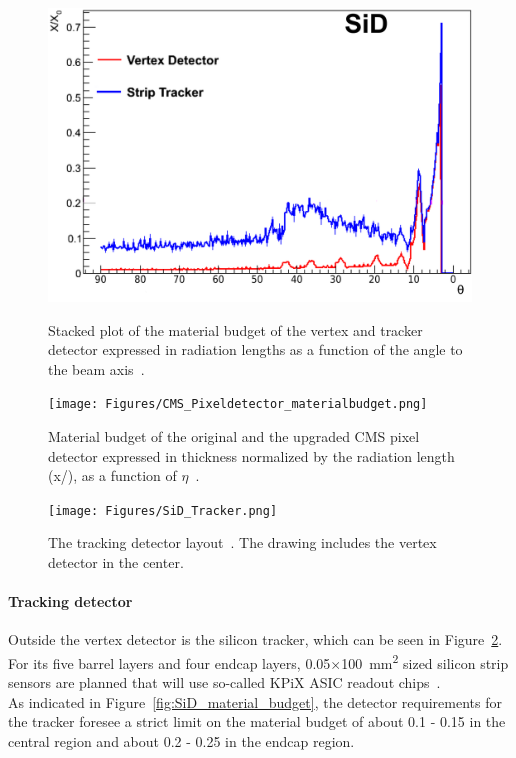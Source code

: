 \begin{figure}[!h]
\centering
 \begin{minipage}[t]{0.49\textwidth}
 \centering
\includegraphics[width=\textwidth]{Figures/SiD_material_budget.png}
\caption[Material budget of the \sid vertex and tracker detector]{Stacked plot of the material budget of the \sid vertex and tracker detector expressed in radiation lengths as a function of the angle to the beam axis~\cite[cf. p. 51]{Marcels_general_SiD_slides}.}
\label{fig:SiD_material_budget}
\end{minipage}
\hfill
\begin{minipage}[t]{0.49\textwidth}
\centering
\texttt{[image: Figures/CMS\_Pixeldetector\_materialbudget.png]}
\caption[Material budget of the CMS pixel detector]{Material budget of the original and the upgraded CMS pixel detector expressed in thickness normalized by the radiation length (x/\si{\xzero}), as a function of $\eta$~\cite{CMS_pixeldetector}.}
\label{fig:CMS}
\end{minipage}
\end{figure}


\begin{figure}[h!]
\centering
\texttt{[image: Figures/SiD\_Tracker.png]}
\caption[Drawing of the \sid tracking detector]{The \sid tracking detector layout~\cite{SiD_Update2}.
The drawing includes the vertex detector in the center.}
\label{fig:SiD_tracker}
\end{figure}

\paragraph{Tracking detector}
Outside the vertex detector is the silicon tracker, which can be seen in Figure~\ref{fig:SiD_tracker}.
For its five barrel layers and four endcap layers, \num{0.05}$\times$\SI{100}{\milli\meter\squared} sized silicon strip sensors are planned that will use so-called KPiX ASIC readout chips~\cite[p. 74ff]{TDR4}.
\\As indicated in Figure~\ref{fig:SiD_material_budget}, the detector requirements for the tracker foresee a strict limit on the material budget of about 0.1 - \SI{0.15}{\xzero} in the central region and about 0.2 - \SI{0.25}{\xzero} in the endcap region.

